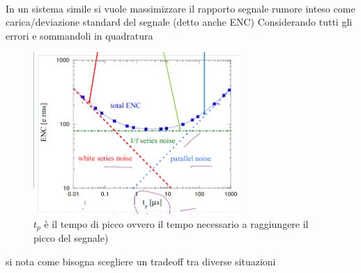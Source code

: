 \begin{eg} \hfill \\ 
    In un sistema simile si vuole massimizzare il rapporto segnale rumore inteso come carica/deviazione standard del segnale (detto anche ENC)
Considerando tutti gli errori e sommandoli in quadratura 

\begin{figure}[H]
    \centering
    \includegraphics[width=0.7\textwidth,frame]{Chapters/images/Interazione_radiazione_materia/image-20220302174553973.png}
    \captionsetup{width=0.7\textwidth}
    \caption{$t_p$ è il tempo di picco ovvero il tempo necessario a raggiungere il picco del segnale)}

\end{figure}
si nota come bisogna scegliere un tradeoff tra diverse situazioni
\end{eg}